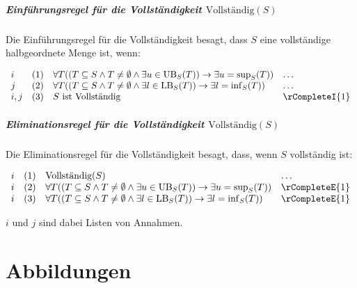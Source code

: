 \documentclass[main.tex]{subfiles}
\begin{document}
\paragraph{Einführungsregel für die Vollständigkeit \(\text{Vollständig}(S)\)}
Die Einführungsregel für die Vollständigkeit besagt, dass \( S \) eine vollständige halbgeordnete Menge ist, wenn:

\[
\begin{array}{llll}
    i   & (1) & \forall T((T\subseteq S\land T \neq \emptyset\land \exists u \in \text{UB}_S(T)) \rightarrow \exists u = \sup_S(T)) & \dots \\
    j   & (2) & \forall T((T\subseteq S\land T \neq \emptyset\land \exists l \in \text{LB}_S(T)) \rightarrow \exists l = \inf_S(T)) & \dots \\
    i,j & (3) & S \text{ ist Vollständig} & \rCompleteI{1}
\end{array}
\]

\paragraph{Eliminationsregel für die Vollständigkeit \(\text{Vollständig}(S)\)}
Die Eliminationsregel für die Vollständigkeit besagt, dass, wenn \( S \) vollständig ist:

\[
\begin{array}{llll}
    i & (1) & \text{Vollständig}(S) & \dots \\
    i & (2) & \forall T((T\subseteq S\land T \neq \emptyset\land \exists u \in \text{UB}_S(T)) \rightarrow \exists u = \sup_S(T)) & \rCompleteE{1} \\
    i & (3) & \forall T((T\subseteq S\land T \neq \emptyset\land \exists l \in \text{LB}_S(T)) \rightarrow \exists l = \inf_S(T)) & \rCompleteE{1}
\end{array}
\]

\(i\) und \(j\) sind dabei Listen von Annahmen.


\chapter{Abbildungen}
\end{document}
